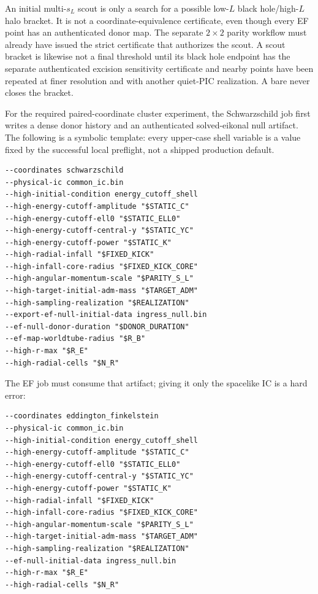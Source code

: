 An initial multi-\(s_L\) scout is only a search for a possible low-\(L\)
black hole/high-\(L\) halo bracket.  It is not a coordinate-equivalence
certificate, even though every EF point has an authenticated donor map.  The
separate \(2\times2\) parity workflow must already have issued the strict
certificate that authorizes the scout.  A scout bracket is likewise not a
final threshold until its black hole endpoint has the separate authenticated
excision sensitivity certificate and nearby points have been repeated at
finer resolution and with another quiet-PIC realization.  A bare
 never closes the bracket.

For the required paired-coordinate cluster experiment, the Schwarzschild job
first writes a dense donor history and an authenticated solved-eikonal null
artifact.  The following is a symbolic template: every upper-case shell
variable is a value fixed by the successful local preflight, not a shipped
production default.
\begin{lstlisting}[basicstyle=\ttfamily\scriptsize]
--coordinates schwarzschild
--physical-ic common_ic.bin
--high-initial-condition energy_cutoff_shell
--high-energy-cutoff-amplitude "$STATIC_C"
--high-energy-cutoff-ell0 "$STATIC_ELL0"
--high-energy-cutoff-central-y "$STATIC_YC"
--high-energy-cutoff-power "$STATIC_K"
--high-radial-infall "$FIXED_KICK"
--high-infall-core-radius "$FIXED_KICK_CORE"
--high-angular-momentum-scale "$PARITY_S_L"
--high-target-initial-adm-mass "$TARGET_ADM"
--high-sampling-realization "$REALIZATION"
--export-ef-null-initial-data ingress_null.bin
--ef-null-donor-duration "$DONOR_DURATION"
--ef-map-worldtube-radius "$R_B"
--high-r-max "$R_E"
--high-radial-cells "$N_R"
\end{lstlisting}
The EF job must consume that artifact; giving it only the spacelike IC is a
hard error:
\begin{lstlisting}[basicstyle=\ttfamily\scriptsize]
--coordinates eddington_finkelstein
--physical-ic common_ic.bin
--high-initial-condition energy_cutoff_shell
--high-energy-cutoff-amplitude "$STATIC_C"
--high-energy-cutoff-ell0 "$STATIC_ELL0"
--high-energy-cutoff-central-y "$STATIC_YC"
--high-energy-cutoff-power "$STATIC_K"
--high-radial-infall "$FIXED_KICK"
--high-infall-core-radius "$FIXED_KICK_CORE"
--high-angular-momentum-scale "$PARITY_S_L"
--high-target-initial-adm-mass "$TARGET_ADM"
--high-sampling-realization "$REALIZATION"
--ef-null-initial-data ingress_null.bin
--high-r-max "$R_E"
--high-radial-cells "$N_R"
\end{lstlisting}
